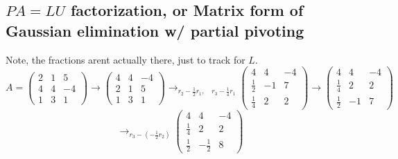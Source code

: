 \documentclass[11pt]{article}
\begin{document}
\subsection{\texorpdfstring{$PA = LU$ factorization}{PA = LU factorization}, or Matrix form of Gaussian elimination w/ partial pivoting}
\begin{example}
    Note, the fractions arent actually there, just to track for $L$.
    \[
        A = \begin{pmatrix}
            2 & 1 & 5\\
            4 & 4 & -4\\
            1 & 3 & 1
        \end{pmatrix}
        \longrightarrow
       \begin{pmatrix}
            4 & 4 & -4\\
            2 & 1 & 5\\
            1 & 3 & 1
        \end{pmatrix} 
        \longrightarrow_{r_2 - \frac{1}{2}r_1, \quad r_3 - \frac{1}{4}r_1}
       \begin{pmatrix}
            4 & 4 & -4\\
            \frac{1}{2} & -1 & 7\\
            \frac{1}{4} & 2 & 2
        \end{pmatrix} 
        \longrightarrow        
       \begin{pmatrix}
            4 & 4 & -4\\
            \frac{1}{4} & 2 & 2\\
            \frac{1}{2} & -1 & 7
        \end{pmatrix} 
        \]
        \[
            \longrightarrow_{r_3 - (-\frac{1}{2}r_2)}
            \begin{pmatrix}
            4 & 4 & -4\\
            \frac{1}{4} & 2 & 2\\
            \frac{1}{2} & -\frac{1}{2} & 8
        \end{pmatrix} 
        \]
        

\end{example}
\end{document}
